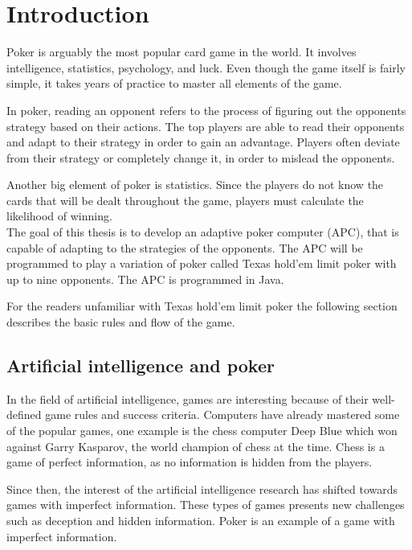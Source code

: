 \section*{Introduction}
Poker is arguably the most popular card game in the world. It involves intelligence, statistics, psychology, and luck. Even though the game itself is fairly simple, it takes years of practice to master all elements of the game.

In poker, reading an opponent refers to the process of figuring out the opponents strategy based on their actions. The top players are able to read their opponents and adapt to their strategy in order to gain an advantage. Players often deviate from their strategy or completely change it, in order to mislead the opponents.

Another big element of poker is statistics. Since the players do not know the cards that will be dealt throughout the game, players must calculate the likelihood of winning. \\

The goal of this thesis is to develop an adaptive poker computer (APC), that is capable of adapting to the strategies of the opponents. The APC will be programmed to play a variation of poker called Texas hold'em limit poker with up to nine opponents. The APC is programmed in Java.

For the readers unfamiliar with Texas hold'em limit poker the following section describes the basic rules and flow of the game.



\subsection*{Artificial intelligence and poker}
In the field of artificial intelligence, games are interesting because of their well-defined game rules and success criteria.
Computers have already mastered some of the popular games, one example is the chess computer Deep Blue which won against Garry Kasparov, the world champion of chess at the time.
Chess is a game of perfect information, as no information is hidden from the players.

Since then, the interest of the artificial intelligence research has shifted towards games with imperfect information. These types of games presents new challenges such as deception and hidden information. Poker is an example of a game with imperfect information.\\


